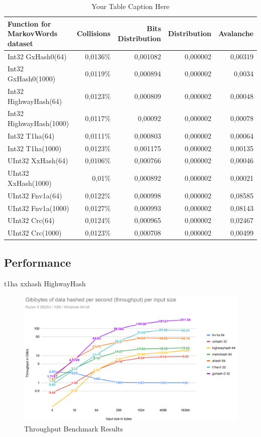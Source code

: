 \documentclass[10pt]{article}
\begin{document}
\begin{table}[H]
\centering
\begin{tabular}{|l|r|r|r|r|}
\hline
\textbf{Function for MarkovWords dataset} & \textbf{Collisions} & \textbf{Bits Distribution} & \textbf{Distribution} & \textbf{Avalanche} \\
\hline
Int32 GxHash0(64)                & 0,0136\% & 0,001082  & 0,000002 & 0,00319 \\
Int32 GxHash0(1000)              & 0,0119\% & 0,000894  & 0,000002 & 0,0034 \\
Int32 HighwayHash(64)            & 0,0123\% & 0,000809  & 0,000002 & 0,00048 \\
Int32 HighwayHash(1000)          & 0,0117\% & 0,00092   & 0,000002 & 0,00078 \\
Int32 T1ha(64)                   & 0,0111\% & 0,000803  & 0,000002 & 0,00064 \\
Int32 T1ha(1000)                 & 0,0123\% & 0,001175  & 0,000002 & 0,00135 \\
UInt32 XxHash(64)                & 0,0106\% & 0,000766  & 0,000002 & 0,00046 \\
UInt32 XxHash(1000)              & 0,01\%   & 0,000892  & 0,000002 & 0,00021 \\
UInt32 Fnv1a(64)                 & 0,0122\% & 0,000998  & 0,000002 & 0,08585 \\
UInt32 Fnv1a(1000)               & 0,0127\% & 0,000993  & 0,000002 & 0,08143 \\
UInt32 Crc(64)                   & 0,0124\% & 0,000965  & 0,000002 & 0,02467 \\
UInt32 Crc(1000)                 & 0,0123\% & 0,000708  & 0,000002 & 0,00499 \\
\hline
\end{tabular}
\caption{Your Table Caption Here}
\label{tab:my_label}
\end{table}

\clearpage
\subsection{Performance}

t1ha\cite{rust-t1ha} xxhash\cite{twox-hash} HighwayHash\cite{highway-rs}

\begin{figure}[H]
\centering
\includegraphics[width=1\textwidth]{throughput.png}
\caption{Throughput Benchmark Results}
\label{fig:benchmark-throughput}
\end{figure}
\end{document}
